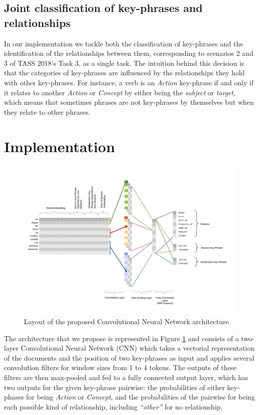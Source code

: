 \documentclass[a4paper,11pt,twocolumn,twoside]{article}
\begin{document}
\subsection{Joint classification of key-phrases and relationships}

In our implementation we tackle both the classification of key-phrases and the identification of the relationships between them, corresponding to scenarios 2 and 3 of TASS 2018's Task 3, as a single task. The intuition behind this decision is that the categories of key-phrases are influenced by the relationships they hold with other key-phrases. For instance, a verb is an \emph{Action} key-phrase if and only if it relates to another \emph{Action} or \emph{Concept} by either being the \emph{subject} or \emph{target}, which means that sometimes phrases are not key-phrases by themselves but when they relate to other phrases.

\section{Implementation}

\begin{figure}[ht]
    \centering
    \includegraphics[width=0.9\linewidth,trim={0 1.7cm 0 2.2cm},clip]{diagramtass18.pdf}
    \caption{Layout of the proposed Convolutional Neural Network architecture}
    \label{fig:architecture}
\end{figure}

The architecture that we propose is represented in Figure \ref{fig:architecture} and consists of a two-layer Convolutional Neural Network (CNN) which takes a vectorial representation of the documents and the position of two key-phrases as input and applies several convolution filters for window sizes from 1 to 4 tokens. The outputs of these filters are then max-pooled and fed to a fully connected output layer, which has two outputs for the given key-phrase pairwise: the probabilities of either key-phases for being \emph{Action} or \emph{Concept}, and the probabilities of the pairwise for being each possible kind of relationship, including \emph{``other''} for no relationship.
\end{document}

